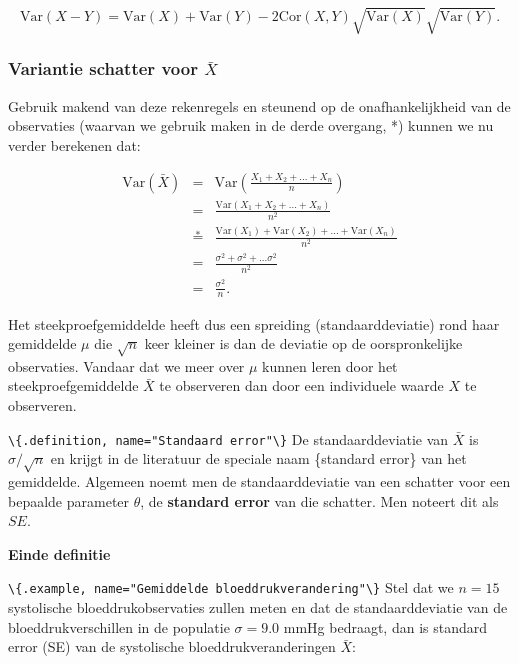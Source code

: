 \documentclass[
  12pt,dutch,coursenotes]{book}
\newcommand{\passthrough}[1]{#1}
\begin{document}
\begin{equation*}
\text{Var}(X-Y) = \text{Var}(X) + \text{Var}(Y) -2{\text{Cor}}(X,Y)\sqrt{\text{Var}(X)}\sqrt{\text{Var}(Y)}.
\end{equation*}

\hypertarget{variantie-schatter-voor-bar-x}{%
\subsubsection{\texorpdfstring{Variantie schatter voor \(\bar X\)}{Variantie schatter voor \textbackslash bar X}}\label{variantie-schatter-voor-bar-x}}

Gebruik makend van deze rekenregels en steunend
op de onafhankelijkheid van de observaties (waarvan we gebruik maken in de
derde overgang, *) kunnen we nu verder berekenen dat:

\begin{eqnarray*}
\text{Var}(\bar X)&=&\text{Var} \left(\frac{X_1+ X_2+ ... + X_n}{n}\right) \\
&= & \frac{\text{Var} (X_1+ X_2+ ... + X_n)}{n^2} \\
&\overset{*}{=} & \frac{\text{Var}(X_1)+ \text{Var}(X_2)+ ... + \text{Var}(X_n)}{n^2} \\
&=& \frac{\sigma^2 + \sigma^2 + ... \sigma^2}{n^2} \\
&= & \frac{\sigma^2}{n}.
\end{eqnarray*}

Het steekproefgemiddelde heeft dus een spreiding (standaarddeviatie) rond
haar gemiddelde \(\mu\) die \(\sqrt{n}\) keer kleiner is dan de deviatie op de
oorspronkelijke observaties. Vandaar dat we meer over \(\mu\) kunnen leren
door het steekproefgemiddelde \(\bar X\) te observeren dan door een
individuele waarde \(X\) te observeren.

\passthrough{\lstinline!\{.definition, name="Standaard error"\}!}
De standaarddeviatie van \(\bar{X}\) is \(\sigma/\sqrt{n}\) en krijgt in de literatuur de speciale naam \{standard error\} van
het gemiddelde. Algemeen noemt men de standaarddeviatie van een schatter
voor een bepaalde parameter \(\theta\), de \textbf{standard error} van die
schatter. Men noteert dit als \(SE\).

\textbf{Einde definitie}

\passthrough{\lstinline!\{.example, name="Gemiddelde bloeddrukverandering"\}!}
Stel dat we \(n = 15\) systolische bloeddrukobservaties zullen meten en dat de standaarddeviatie van de bloeddrukverschillen in de populatie \(\sigma = 9.0\) mmHg bedraagt, dan is standard error (SE) van de systolische bloeddrukveranderingen \(\bar X\):
\end{document}
